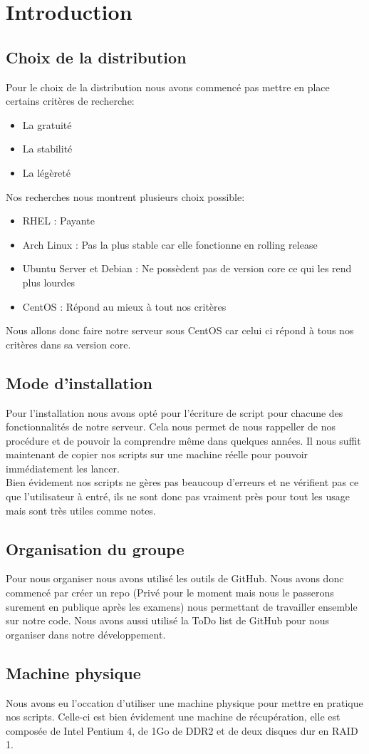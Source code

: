 \section{Introduction}
\subsection{Choix de la distribution}
Pour le choix de la distribution nous avons commencé pas mettre en place certains critères de recherche:
\begin{itemize}
	\item La gratuité
	\item La stabilité
	\item La légèreté
\end{itemize}
Nos recherches nous montrent plusieurs choix possible:
\begin{itemize}
	\item RHEL : Payante
	\item Arch Linux : Pas la plus stable car elle fonctionne en rolling release
	\item Ubuntu Server et Debian : Ne possèdent pas de version core ce qui les rend plus lourdes
	\item CentOS : Répond au mieux à tout nos critères
\end{itemize}
Nous allons donc faire notre serveur sous CentOS car celui ci répond à tous nos critères dans sa version core.

\subsection{Mode d'installation}
Pour l'installation nous avons opté pour l'écriture de script pour chacune des fonctionnalités de notre serveur. Cela nous permet de nous rappeller de nos procédure et de pouvoir la comprendre même dans quelques années.
Il nous suffit maintenant de copier nos scripts sur une machine réelle pour pouvoir immédiatement les lancer.\\
Bien évidement nos scripts ne gères pas beaucoup d'erreurs et ne vérifient pas ce que l'utilisateur à entré, ils ne sont donc pas vraiment près pour tout les usage mais sont très utiles comme notes.

\subsection{Organisation du groupe}
Pour nous organiser nous avons utilisé les outils de GitHub. Nous avons donc commencé par créer un repo (Privé pour le moment mais nous le passerons surement en publique après les examens) nous permettant de travailler ensemble sur notre code. Nous avons aussi utilisé la ToDo list de GitHub pour nous organiser dans notre développement.

\subsection{Machine physique}
Nous avons eu l'occation d'utiliser une machine physique pour mettre en pratique nos scripts. Celle-ci est bien évidement une machine de récupération, elle est composée de Intel Pentium 4, de 1Go de DDR2 et de deux disques dur en RAID 1.
